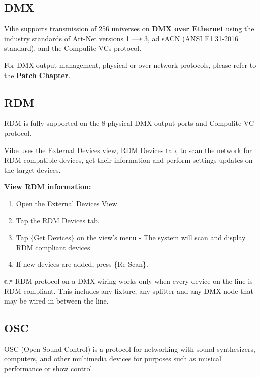 \documentclass[
]{article}
\begin{document}
\hypertarget{DMX-17.3}{%
\subsection{DMX}\label{DMX-17.3}}

Vibe supports transmission of 256 universes on \textbf{DMX over Ethernet} using the industry standards of Art-Net versions 1 ⟶ 3, ad sACN (ANSI E1.31-2016 standard). and the Compulite VCs protocol.

For DMX output management, physical or over network protocols, please refer to the \textbf{Patch Chapter}.

\hypertarget{RDM-17.4}{%
\subsection{RDM}\label{RDM-17.4}}

RDM is fully supported on the 8 physical DMX output ports and Compulite VC protocol.

Vibe uses the External Devices view, RDM Devices tab, to scan the network for RDM compatible devices, get their information and perform settings updates on the target devices.

\textbf{View RDM information:}

\begin{enumerate}
\def\labelenumi{\arabic{enumi}.}
\item
  Open the External Devices View.
\item
  Tap the RDM Devices tab.
\item
  Tap \{Get Devices\} on the view's menu - The system will scan and display RDM compliant devices.
\item
  If new devices are added, press \{Re Scan\}.
\end{enumerate}

👉 RDM protocol on a DMX wiring works only when every device on the line is RDM compliant. This includes any fixture, any splitter and any DMX node that may be wired in between the line.

\hypertarget{OSC-17.5}{%
\subsection{OSC}\label{OSC-17.5}}

OSC (Open Sound Control) is a protocol for networking with sound synthesizers, computers, and other multimedia devices for purposes such as musical performance or show control.
\end{document}
